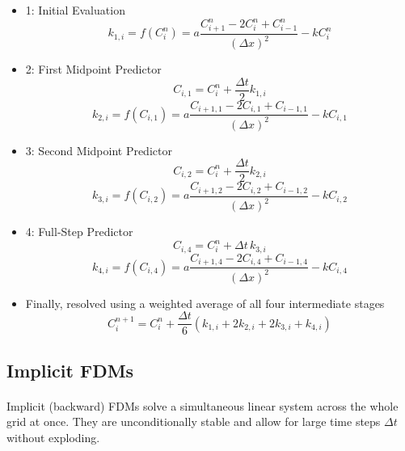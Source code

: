 \begin{itemize}

\item[] 1: Initial Evaluation
\begin{equation*}
k_{1,i} = f(C_i^n) = a \frac{C_{i+1}^n - 2C_i^n + C_{i-1}^n}{(\Delta x)^2} - kC_i^n
\end{equation*}

\item[] 2: First Midpoint Predictor
\begin{equation*}
C_{i,1} = C_i^n + \frac{\Delta t}{2} k_{1,i}
\end{equation*}
\begin{equation*}
k_{2,i} = f(C_{i,1}) = a \frac{C_{i+1,1} - 2C_{i,1} + C_{i-1,1}}{(\Delta x)^2} - kC_{i,1}
\end{equation*}

\item[] 3: Second Midpoint Predictor
\begin{equation*}
C_{i,2} = C_i^n + \frac{\Delta t}{2} k_{2,i}
\end{equation*}
\begin{equation*}
k_{3,i} = f(C_{i,2}) = a \frac{C_{i+1,2} - 2C_{i,2} + C_{i-1,2}}{(\Delta x)^2} - kC_{i,2}
\end{equation*}

\item[] 4: Full-Step Predictor
\begin{equation*}
C_{i,4} = C_i^n + \Delta t \, k_{3,i}
\end{equation*}
\begin{equation*}
k_{4,i} = f(C_{i,4}) = a \frac{C_{i+1,4} - 2C_{i,4} + C_{i-1,4}}{(\Delta x)^2} - kC_{i,4}
\end{equation*}

\item[] Finally, resolved using a weighted average of all four intermediate stages
\begin{equation*}
C_i^{n+1} = C_i^n + \frac{\Delta t}{6} \left( k_{1,i} + 2k_{2,i} + 2k_{3,i} + k_{4,i} \right)
\end{equation*}

\end{itemize}

\subsection*{Implicit FDMs}
\paragraph{}
Implicit (backward) FDMs solve a simultaneous linear system across the whole grid at once. They are unconditionally stable and allow for large time steps $\Delta t$ without exploding.

